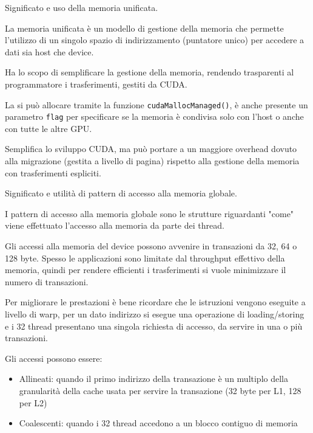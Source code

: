 \begin{questions}
    \question Significato e uso della memoria unificata.
    
    \begin{solution}
        La memoria unificata è un modello di gestione della memoria che permette l'utilizzo di un singolo spazio di indirizzamento (puntatore unico) per accedere a dati sia host che device. 
        
        Ha lo scopo di semplificare la gestione della memoria, rendendo trasparenti al programmatore i trasferimenti, gestiti da CUDA. 
        
        La si può allocare tramite la funzione \texttt{cudaMallocManaged()}, è anche presente un parametro \texttt{flag} per specificare se la memoria è condivisa solo con l'host o anche con tutte le altre GPU.
        
        Semplifica lo sviluppo CUDA, ma può portare a un maggiore overhead dovuto alla migrazione (gestita a livello di pagina) rispetto alla gestione della memoria con trasferimenti espliciti.
    \end{solution}
    
    \question Significato e utilità di pattern di accesso alla memoria globale.
    
    \begin{solution}
        I pattern di accesso alla memoria globale sono le strutture riguardanti "come" viene effettuato l'accesso alla memoria da parte dei thread.
        
        Gli accessi alla memoria del device possono avvenire in transazioni da 32, 64 o 128 byte. Spesso le applicazioni sono limitate dal throughput effettivo della memoria, quindi per rendere efficienti i trasferimenti si vuole minimizzare il numero di transazioni. 
        
        Per migliorare le prestazioni è bene ricordare che le istruzioni vengono eseguite a livello di warp, per un dato indirizzo si esegue una operazione di loading/storing e i 32 thread presentano una singola richiesta di accesso, da servire in una o più transazioni.
        
        Gli accessi possono essere:
        \begin{itemize}
            \item Allineati: quando il primo indirizzo della transazione è un multiplo della granularità della cache usata per servire la transazione (32 byte per L1, 128 per L2)
            
            \item Coalescenti: quando i 32 thread accedono a un blocco contiguo di memoria
        \end{itemize}
        

\end{solution}
\end{questions}
